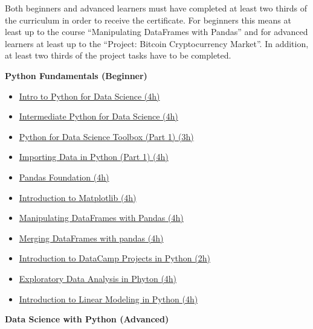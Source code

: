 \documentclass[
  11pt,
]{article}
\providecommand{\tightlist}{%
  \setlength{\itemsep}{0pt}\setlength{\parskip}{0pt}}
\newenvironment{tipsp}[1]
  {
  \begin{itemize}
  \footnotesize
  \renewcommand{\labelitemi}{
    \raisebox{-.7\height}[0pt][0pt]{
      {\setkeys{Gin}{width=3em,keepaspectratio}
        \texttt{[image: images/\#1.png]}}
    }
  }
  \setlength{\fboxsep}{1em}
  \begin{pbox}
  \item
  }
  {
  \end{pbox}
  \end{itemize}
  }
\begin{document}
Both beginners and advanced learners must have completed at least two thirds of the curriculum in order to receive the certificate. For beginners this means at least up to the course ``Manipulating DataFrames with Pandas'' and for advanced learners at least up to the ``Project: Bitcoin Cryptocurrency Market''. In addition, at least two thirds of the project tasks have to be completed.

\begin{tipsp}p

\textbf{Python Fundamentals (Beginner) }

\begin{itemize}
\tightlist
\item
  \href{https://www.datacamp.com/courses/introduction-to-data-science-in-python}{Intro to Python for Data Science (4h)}
\item
  \href{https://www.datacamp.com/courses/intermediate-python-for-data-science}{Intermediate Python for Data Science (4h)}
\item
  \href{https://www.datacamp.com/courses/python-data-science-toolbox-part-1}{Python for Data Science Toolbox (Part 1) (3h)}
\item
  \href{https://www.datacamp.com/courses/importing-data-in-python-part-1}{Importing Data in Python (Part 1) (4h)}
\item
  \href{https://www.datacamp.com/courses/pandas-foundations}{Pandas Foundation (4h)}
\item
  \href{https://www.datacamp.com/courses/introduction-to-matplotlib}{Introduction to Matplotlib (4h)}
\item
  \href{https://www.datacamp.com/courses/manipulating-dataframes-with-pandas}{Manipulating DataFrames with Pandas (4h)}
\item
  \href{https://www.datacamp.com/courses/merging-dataframes-with-pandas}{Merging DataFrames with pandas (4h)}
\item
  \href{https://www.datacamp.com/projects/33}{Introduction to DataCamp Projects in Python (2h)}
\item
  \href{https://www.datacamp.com/courses/exploratory-data-analysis-in-python}{Exploratory Data Analysis in Phyton (4h)}
\item
  \href{https://www.datacamp.com/courses/introduction-to-linear-modeling-in-python}{Introduction to Linear Modeling in Python (4h)}
\end{itemize}

\textbf{Data Science with Python (Advanced) }


\end{tipsp}
\end{document}
